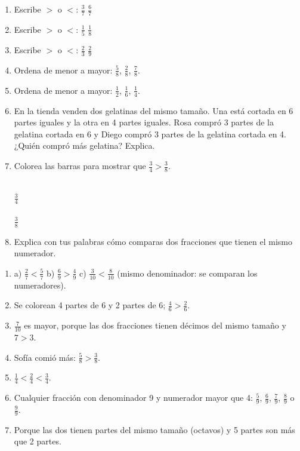 \begin{wbreview}
\begin{enumerate}
\item Escribe $>$ o $<$: $\frac{3}{7}$ \wbblank[1.5cm] $\frac{6}{7}$

\item Escribe $>$ o $<$: $\frac{1}{5}$ \wbblank[1.5cm] $\frac{1}{8}$

\item Escribe $>$ o $<$: $\frac{2}{3}$ \wbblank[1.5cm] $\frac{2}{9}$

\item Ordena de menor a mayor: $\frac{5}{8}$, $\frac{2}{8}$, $\frac{7}{8}$.

\item Ordena de menor a mayor: $\frac{1}{2}$, $\frac{1}{6}$, $\frac{1}{4}$.

\item En la tienda venden dos gelatinas del mismo tamaño. Una está cortada en 6 partes iguales y la otra en 4 partes iguales. Rosa compró 3 partes de la gelatina cortada en 6 y Diego compró 3 partes de la gelatina cortada en 4. ¿Quién compró más gelatina? Explica.

\item Colorea las barras para mostrar que $\frac{3}{4} > \frac{3}{8}$.

\begin{center}
\\[1mm]
$\frac{3}{4}$\\[3mm]
\\[1mm]
$\frac{3}{8}$
\end{center}

\item Explica con tus palabras cómo comparas dos fracciones que tienen el mismo numerador.
\end{enumerate}
\end{wbreview}
\begin{enumerate}
\item a) $\frac{2}{7} < \frac{5}{7}$ \quad b) $\frac{6}{9} > \frac{4}{9}$ \quad c) $\frac{3}{10} < \frac{8}{10}$ (mismo denominador: se comparan los numeradores).
\item Se colorean 4 partes de 6 y 2 partes de 6; $\frac{4}{6} > \frac{2}{6}$.
\item $\frac{7}{10}$ es mayor, porque las dos fracciones tienen décimos del mismo tamaño y $7 > 3$.
\item Sofía comió más: $\frac{5}{8} > \frac{3}{8}$.
\item $\frac{1}{4} < \frac{2}{4} < \frac{3}{4}$.
\item Cualquier fracción con denominador 9 y numerador mayor que 4: $\frac{5}{9}$, $\frac{6}{9}$, $\frac{7}{9}$, $\frac{8}{9}$ o $\frac{9}{9}$.
\item Porque las dos tienen partes del mismo tamaño (octavos) y 5 partes son más que 2 partes.
\end{enumerate}

